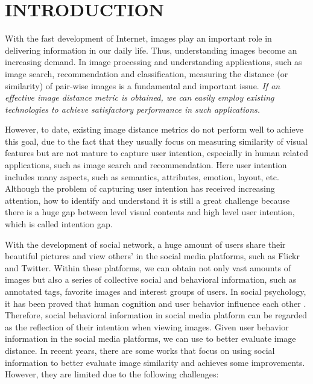 \vspace{-0.3cm}\section{INTRODUCTION}
With the fast development of Internet, images play an important role in delivering information in our daily life. Thus, understanding images become an increasing demand. In image processing and understanding applications, such as image search, recommendation and classification, measuring the distance (or similarity) of pair-wise images is a fundamental and important issue. \emph{If an effective image distance metric is obtained, we can easily employ existing technologies to achieve satisfactory performance in such applications\cite{visualrank,cbf}.}

However, to date, existing image distance metrics do not perform well to achieve this goal, due to the fact that they usually focus on measuring similarity of visual features but are not mature to capture user intention, especially in human related applications, such as image search and recommendation. Here user intention includes many aspects, such as semantics, attributes, emotion, layout, etc. Although the problem of capturing user intention has received increasing attention, how to identify and understand it is still a great challenge because there is a huge gap between level visual contents and high level user intention, which is called intention gap.

 With the development of social network, a huge amount of users share their beautiful pictures and view others' in the social media platforms, such as Flickr and Twitter. Within these platforms, we can obtain not only vast amounts of images but also a series of collective social and behavioral information, such as annotated tags, favorite images and interest groups of users. In social psychology, it has been proved that human cognition and user behavior influence each other \cite{cognitive}. Therefore, social behavioral information in social media platform can be regarded as the reflection of their intention when viewing images. Given user behavior information in the social media platforms, we can use to better evaluate image distance. In recent years, there are some works that focus on using social information to better evaluate image similarity and achieves some improvements. However, they are limited due to the following challenges:





